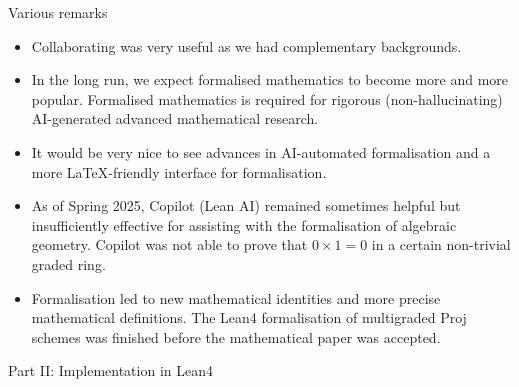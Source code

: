 \documentclass[9pt]{beamer}
\begin{document}
\begin{frame}{Various remarks}
\begin{itemize}

\item Collaborating was very useful as we had complementary backgrounds.
  
\item In the long run, we expect formalised mathematics to become more and more popular. Formalised mathematics is required for rigorous (non-hallucinating) AI-generated advanced mathematical research.  
  
\item It would be very nice to see advances in AI-automated formalisation and a more \LaTeX-friendly interface for formalisation.
  
\item As of Spring 2025, Copilot (Lean AI) remained sometimes helpful but insufficiently effective for assisting with the formalisation of algebraic geometry. Copilot was not able to prove that $0 \times 1 = 0$ in a certain non-trivial graded ring.

\item Formalisation led to new mathematical identities and more precise mathematical definitions. The Lean4 formalisation of multigraded Proj schemes was finished before the mathematical paper was accepted.

\end{itemize}


\end{frame}

\begin{frame}
\begin{center}
Part II: Implementation in Lean4
\end{center}
\end{frame}
\end{document}
